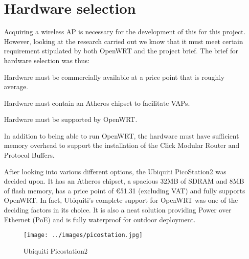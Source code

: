   \section{Hardware selection}

    Acquiring a wireless AP is necessary for the development of this for this project. However, looking at the research carried out we know that it must meet certain requirement stipulated by both OpenWRT and the project brief. The brief for hardware selection was thus:

    \begin{enumerate*}
    \item Hardware must be commercially available at a price point that is roughly average.
    \item Hardware must contain an Atheros chipset to facilitate VAPs.
    \item Hardware must be supported by OpenWRT.
    \item In addition to being able to run OpenWRT, the  hardware must have sufficient memory overhead to support the installation of the Click Modular Router and Protocol Buffers.
    \end{enumerate*}

    After looking into various different options, the Ubiquiti PicoStation2 was decided upon. It has an Atheros chipset, a spacious 32MB of SDRAM and 8MB of flash memory, has a price point of \euro51.31 (excluding VAT)\cite{wipipe} and fully supports OpenWRT. In fact, Ubiquiti's complete support for OpenWRT was one of the deciding factors in its choice. It is also a neat solution providing Power over Ethernet (PoE) and is fully waterproof for outdoor deployment.
    \begin{figure}[h]
    \centering
    \texttt{[image: ../images/picostation.jpg]}
    \caption{Ubiquiti Picostation2}
    \label{fig:picostation}
    \end{figure}





